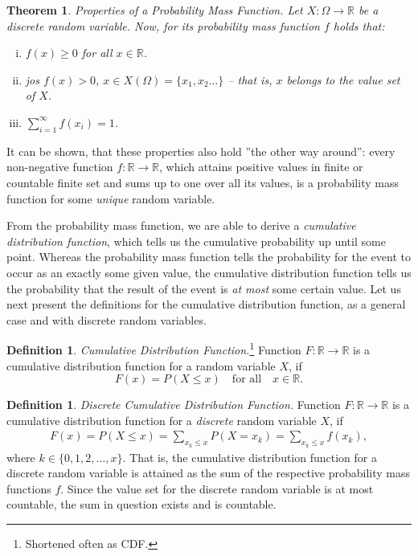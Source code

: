 \documentclass[12pt,a4paper,leqno]{report}
\newcommand{\R}{\mathbb{R}}
\theoremstyle{plain}
\newtheorem{lause}[equation]{Theorem}
\theoremstyle{definition}
\newtheorem{maar}[equation]{Definition}
\begin{document}
\begin{lause}
\label{lause:pmf_properties}
Properties of a Probability Mass Function. Let $X:\Omega \rightarrow \R$ be a discrete random variable. Now, for its probability mass function $f$ holds that:
\begin{enumerate}[(i)]
\item $f(x) \geq 0$ for all $x \in \R$.
\item jos $f(x)>0$, $x \in X(\Omega) = \{x_1, x_2 \dots\}$ -- that is, $x$ belongs to the value set of $X$.
\item $\sum_{i=1}^\infty f(x_i) = 1$.
\end{enumerate}
\end{lause}

It can be shown, that these properties also hold ''the other way around'': every non-negative function $f:\R \rightarrow \R$, which attains positive values in finite or countable finite set and sums up to one over all its values, is a probability mass function for some \emph{unique} random variable.

From the probability mass function, we are able to derive a \emph{cumulative distribution function}, which tells us the cumulative probability up until some point. Whereas the probability mass function tells the probability for the event to occur as an exactly some given value, the cumulative distribution function tells us the probability that the result of the event is \emph{at most} some certain value. Let us next present the definitions for the cumulative distribution function, as a general case and with discrete random variables.

\begin{maar} \label{maar:cdf}
\emph{Cumulative Distribution Function.}\footnote{Shortened often as CDF.}   Function $F:\R \rightarrow \R$ is a cumulative distribution function for a random variable $X$, if
\[
F(x) = P(X \leq x) \quad \text{for all} \quad x \in \R.
\]
\end{maar} 

\begin{maar}
\emph{Discrete Cumulative Distribution Function.} Function $F:\R \rightarrow \R$ is a cumulative distribution function for a \emph{discrete} random variable $X$, if
\begin{align*}
F(x)=P(X\leq x) = \sum_{x_k \leq x} P(X = x_k) = \sum_{x_k \leq x} f(x_k),
\end{align*}
where $k\in\{0,1,2,\dots,x\}$. That is, the cumulative distribution function for a discrete random variable is attained as the sum of the respective probability mass functions $f$. Since the value set for the discrete random variable is at most countable, the sum in question exists and is countable.
\end{maar}
\end{document}
